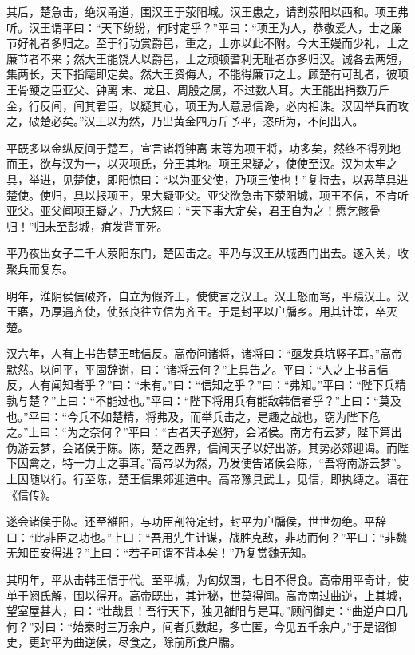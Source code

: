 \documentclass[12pt,UTF8]{ctexbook}
\begin{document}
其后，楚急击，绝汉甬道，围汉王于荥阳城。汉王患之，请割荥阳以西和。项王弗听。汉王谓平曰：“天下纷纷，何时定乎？”平曰：“项王为人，恭敬爱人，士之廉节好礼者多归之。至于行功赏爵邑，重之，士亦以此不附。今大王嫚而少礼，士之廉节者不来；然大王能饶人以爵邑，士之顽顿耆利无耻者亦多归汉。诚各去两短，集两长，天下指麾即定矣。然大王资侮人，不能得廉节之士。顾楚有可乱者，彼项王骨鲠之臣亚父、钟离末、龙且、周殷之属，不过数人耳。大王能出捐数万斤金，行反间，间其君臣，以疑其心，项王为人意忌信谗，必内相诛。汉因举兵而攻之，破楚必矣。”汉王以为然，乃出黄金四万斤予平，恣所为，不问出入。



平既多以金纵反间于楚军，宣言诸将钟离末等为项王将，功多矣，然终不得列地而王，欲与汉为一，以灭项氏，分王其地。项王果疑之，使使至汉。汉为太牢之具，举进，见楚使，即阳惊曰：“以为亚父使，乃项王使也！”复持去，以恶草具进楚使。使归，具以报项王，果大疑亚父。亚父欲急击下荥阳城，项王不信，不肯听亚父。亚父闻项王疑之，乃大怒曰：“天下事大定矣，君王自为之！愿乞骸骨归！”归未至彭城，疽发背而死。



平乃夜出女子二千人荥阳东门，楚因击之。平乃与汉王从城西门出去。遂入关，收聚兵而复东。



明年，淮阴侯信破齐，自立为假齐王，使使言之汉王。汉王怒而骂，平蹑汉王。汉王寤，乃厚遇齐使，使张良往立信为齐王。于是封平以户牖乡。用其计策，卒灭楚。



汉六年，人有上书告楚王韩信反。高帝问诸将，诸将曰：“亟发兵坑竖子耳。”高帝默然。以问平，平固辞谢，曰：’诸将云何？”上具告之。平曰：“人之上书言信反，人有闻知者乎？”曰：“未有。”曰：“信知之乎？”曰：“弗知。”平曰：“陛下兵精孰与楚？”上曰：“不能过也。”平曰：“陛下将用兵有能敌韩信者乎？”上曰：“莫及也。”平曰：“今兵不如楚精，将弗及，而举兵击之，是趣之战也，窃为陛下危之。”上曰：“为之奈何？”平曰：“古者天子巡狩，会诸侯。南方有云梦，陛下第出伪游云梦，会诸侯于陈。陈，楚之西界，信闻天子以好出游，其势必郊迎谒。而陛下因禽之，特一力士之事耳。”高帝以为然，乃发使告诸侯会陈，“吾将南游云梦”。上因随以行。行至陈，楚王信果郊迎道中。高帝豫具武士，见信，即执缚之。语在《信传》。



遂会诸侯于陈。还至雒阳，与功臣剖符定封，封平为户牖侯，世世勿绝。平辞曰：“此非臣之功也。”上曰：“吾用先生计谋，战胜克敌，非功而何？”平曰：“非魏无知臣安得进？”上曰：“若子可谓不背本矣！”乃复赏魏无知。



其明年，平从击韩王信于代。至平城，为匈奴围，七日不得食。高帝用平奇计，使单于阏氏解，围以得开。高帝既出，其计秘，世莫得闻。高帝南过曲逆，上其城，望室屋甚大，曰：“壮哉县！吾行天下，独见雒阳与是耳。”顾问御史：“曲逆户口几何？”对曰：“始秦时三万余户，间者兵数起，多亡匿，今见五千余户。”于是诏御史，更封平为曲逆侯，尽食之，除前所食户牖。
\end{document}

